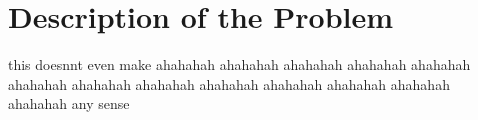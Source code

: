 



\chapter{Description of the Problem}
\label{cha:introduction_description}
this doesnnt even make ahahahah ahahahah ahahahah ahahahah ahahahah ahahahah ahahahah ahahahah ahahahah ahahahah ahahahah ahahahah ahahahah 
any sense





